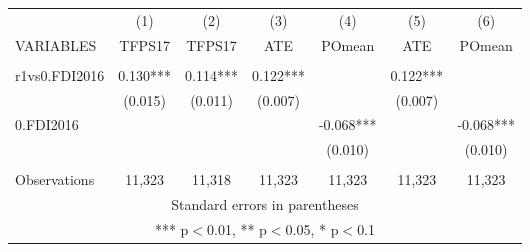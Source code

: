 \documentclass[]{article}
\begin{document}
\begin{tabular}{lcccccc} \hline
 & (1) & (2) & (3) & (4) & (5) & (6) \\
VARIABLES & TFPS17 & TFPS17 & ATE & POmean & ATE & POmean \\ \hline
 &  &  &  &  &  &  \\
r1vs0.FDI2016 & 0.130*** & 0.114*** & 0.122*** &  & 0.122*** &  \\
 & (0.015) & (0.011) & (0.007) &  & (0.007) &  \\
0.FDI2016 &  &  &  & -0.068*** &  & -0.068*** \\
 &  &  &  & (0.010) &  & (0.010) \\
 &  &  &  &  &  &  \\
 Observations & 11,323 & 11,318 & 11,323 & 11,323 & 11,323 & 11,323 \\ \hline
\multicolumn{7}{c}{ Standard errors in parentheses} \\
\multicolumn{7}{c}{ *** p$<$0.01, ** p$<$0.05, * p$<$0.1} \\
\end{tabular}
\end{document}
